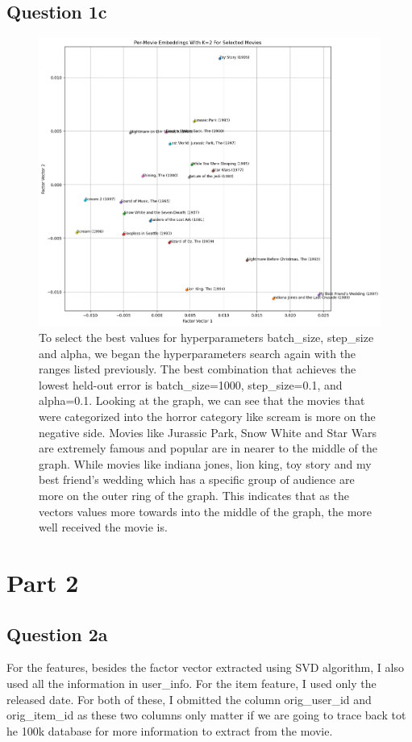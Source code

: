 \documentclass[a4paper]{article}
\begin{document}
\subsection{Question 1c}
\begin{figure}[h]
	\includegraphics[width=\textwidth]{../images/Figure1c.png}
	\caption{
To select the best values for hyperparameters batch\_size, step\_size and alpha,
we began the hyperparameters search again with the ranges listed previously.
The best combination that achieves the lowest held-out error is
batch\_size=1000, step\_size=0.1, and alpha=0.1. Looking at the graph, we can
see that the movies that were categorized into the horror category like scream
is more on the negative side. Movies like Jurassic Park, Snow White and Star Wars are
extremely famous and popular are in nearer to the middle of the graph. While
movies like indiana jones, lion king, toy story and my best friend's wedding
which has a specific group of audience are more on the outer ring of the graph. This
indicates that as the vectors values more towards into the middle of the graph, the more
well received the movie is.}
\end{figure}


\section{Part 2}
\subsection{Question 2a}
For the features, besides the factor vector extracted using SVD algorithm, I
also used all the information in user\_info. For the item feature, I used only
the released date. For both of these, I obmitted the column orig\_user\_id and
orig\_item\_id as these two columns only matter if we are going to trace back
tot he 100k database for more information to extract from the movie. 
\end{document}

